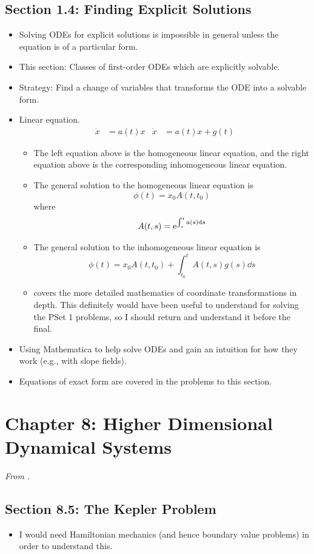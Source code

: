 \documentclass[../notes.tex]{subfiles}
\begin{document}
\subsection*{Section 1.4: Finding Explicit Solutions}
\begin{itemize}
    \item Solving ODEs for explicit solutions is impossible in general unless the equation is of a particular form.
    \item This section: Classes of first-order ODEs which are explicitly solvable.
    \item Strategy: Find a change of variables that transforms the ODE into a solvable form.
    \item Linear equation.
    \begin{align*}
        \dot{x} &= a(t)x&
        \dot{x} &= a(t)x+g(t)
    \end{align*}
    \begin{itemize}
        \item The left equation above is the homogeneous linear equation, and the right equation above is the corresponding inhomogeneous linear equation.
        \item The general solution to the homogeneous linear equation is
        \begin{equation*}
            \phi(t) = x_0A(t,t_0)
        \end{equation*}
        where
        \begin{equation*}
            A(t,s) = \e[\int_s^ta(s)\dd{s}]
        \end{equation*}
        \item The general solution to the inhomogeneous linear equation is
        \begin{equation*}
            \phi(t) = x_0A(t,t_0)+\int_{t_0}^tA(t,s)g(s)\dd{s}
        \end{equation*}
        \item \textcite{bib:Teschl} covers the more detailed mathematics of coordinate transformations in depth. This definitely would have been useful to understand for solving the PSet 1 problems, so I should return and understand it before the final.
    \end{itemize}
    \item Using Mathematica to help solve ODEs and gain an intuition for how they work (e.g., with slope fields).
    \item Equations of exact form are covered in the problems to this section.
\end{itemize}



\section{Chapter 8: Higher Dimensional Dynamical Systems}
\emph{From \textcite{bib:Teschl}.}
\subsection*{Section 8.5: The Kepler Problem}
\begin{itemize}
    \item {}I would need Hamiltonian mechanics (and hence boundary value problems) in order to understand this.
\end{itemize}
\end{document}
